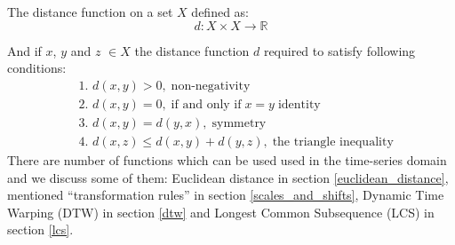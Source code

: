 The distance function on a set $X$ defined as:
\begin{equation}
 d: X \times X \rightarrow \mathbb{R}
\end{equation}

And if $x$, $y$ and $z$ $\in X$ the distance function $d$ required to satisfy following conditions:
\begin{align}
 & \text{1. } d(x, y) > 0, \; \text{non-negativity} \label{eq:d1} \\
 & \text{2. } d(x, y) = 0, \; \text{if and only if} \; x = y  \;  \text{identity} \\
 & \text{3. } d(x, y) = d(y, x), \; \text{symmetry} \\
 & \text{4. } d(x, z) \leq d(x, y) + d(y, z), \; \text{the triangle inequality} \label{eq:d4}
\end{align}
There are number of functions which can be used used in the time-series domain and we discuss some of them: Euclidean distance in section \ref{euclidean_distance}, mentioned ``transformation rules'' in section \ref{scales_and_shifts}, Dynamic Time Warping (DTW) in section \ref{dtw} and Longest Common Subsequence (LCS) in section \ref{lcs}.
